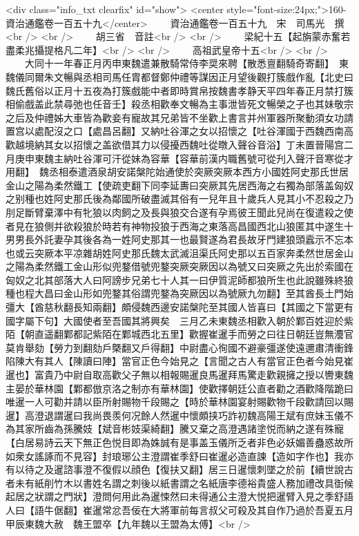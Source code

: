 <div class="info_txt clearfix" id="show">
<center style="font-size:24px;">160-資治通鑑卷一百五十九</center>
  　　資治通鑑卷一百五十九　宋　司馬光　撰<br />
<br />
　　胡三省　音註<br />
<br />
　　梁紀十五【起旃蒙赤奮若盡柔兆攝提格凡二年】<br />
<br />
　　高祖武皇帝十五<br />
<br />
　　大同十一年春正月丙申東魏遣兼散騎常侍李奨來聘【散悉亶翻騎奇寄翻】　東魏儀同爾朱文暢與丞相司馬任胄都督鄭仲禮等謀因正月望後觀打簇戲作亂【北史曰魏氏舊俗以正月十五夜為打簇戲能中者即時賞帛按魏書孝静天平四年春正月禁打簇相偷戲盖此禁尋弛也任音壬】殺丞相歡奉文暢為主事泄皆死文暢榮之子也其妹敬宗之后及仲禮姊大車皆為歡妾有寵故其兄弟皆不坐歡上書言并州軍器所聚動須女功請置宫以處配沒之口【處昌呂翻】又納吐谷渾之女以招懷之【吐谷渾國于西魏西南高歡越境納其女以招懷之盖欲借其力以侵擾西魏吐從暾入聲谷音浴】丁未置晉陽宫二月庚申東魏主納吐谷渾可汗從妹為容華【容華前漢内職舊號可從刋入聲汗音寒從才用翻】　魏丞相泰遣酒泉胡安諾槃陀始通使於突厥突厥本西方小國姓阿史那氏世居金山之陽為柔然鐵工【使疏吏翻下同李延夀曰突厥其先居西海之右獨為部落盖匈奴之别種也姓阿史那氏後為鄰國所破盡滅其俗有一兒年且十歲兵人見其小不忍殺之乃刖足斷臂棄澤中有牝狼以肉飼之及長與狼交合遂有孕焉彼王聞此兒尚在復遣殺之使者見在狼側并欲殺狼於時若有神物投狼于西海之東落高昌國西北山狼匿其中遂生十男男長外託妻孕其後各為一姓阿史那其一也最賢遂為君長故牙門建狼頭蠧示不忘本也或云突厥本平凉雜胡姓阿史那氏魏太武滅沮渠氏阿史那以五百家奔柔然世居金山之陽為柔然鐵工金山形似兜鍪借號兜鍪突厥突厥因以為號又曰突厥之先出於索國在匈奴之北其部落大人曰阿謗步兄弟七十人其一曰伊質泥師都狼所生也此說雖殊終狼種也程大昌曰金山形如兜鍪其俗謂兜鍪為突厥因以為號厥九勿翻】至其酋長土門始彊大【酋慈秋翻長知兩翻】頗侵魏西邊安諾槃陀至其國人皆喜曰【其國之下當更有國字屬下句】大國使者至吾國其將興矣　三月乙未東魏丞相歡入朝於鄴百姓迎於紫陌【朝直遥翻鄴都記紫陌在鄴城西北五里】歡握崔暹手而勞之曰往日朝廷豈無灋官莫肯舉劾【勞力到翻劾戶槩翻又戶得翻】中尉盡心徇國不避豪彊遂使遠邇肅清衝鋒陷陳大有其人【陳讀曰陣】當官正色今始見之【言聞之古人有當官正色者今始見崔暹也】富貴乃中尉自取高歡父子無以相報賜暹良馬暹拜馬驚走歡親擁之授以轡東魏主晏於華林園【鄴都倣京洛之制亦有華林園】使歡擇朝廷公直者勸之酒歡降階跪曰唯暹一人可勸并請以臣所射賜物千段賜之【時於華林園宴射賜歡物千段歡請回以賜暹】高澄退謂暹曰我尚畏羨何况餘人然暹中懷頗挟巧詐初魏高陽王斌有庶妹玉儀不為其家所齒為孫騰妓【斌音彬妓渠綺翻】騰又棄之高澄遇諸塗悦而納之遂有殊寵【白居易詩云天下無正色悦目即為姝誠有是事盖玉儀所乏者非色必妖媚善蠱惑故所如衆女謠諑而不見容】封琅琊公主澄謂崔季舒曰崔暹必造直諫【造如字作也】我亦有以待之及暹諮事澄不復假以顔色【復扶又翻】居三日暹懷刺墜之於前【續世說古者未有紙削竹木以書姓名謂之刺後以紙書謂之名紙唐李德裕貴盛人務加禮改具衘候起居之狀謂之門狀】澄問何用此為暹悚然曰未得通公主澄大悦把暹臂入見之季舒語人曰【語牛倨翻】崔暹常忿吾佞在大將軍前每言叔父可殺及其自作乃過於吾夏五月甲辰東魏大赦　魏王盟卒【九年魏以王盟為太傅】<br />
